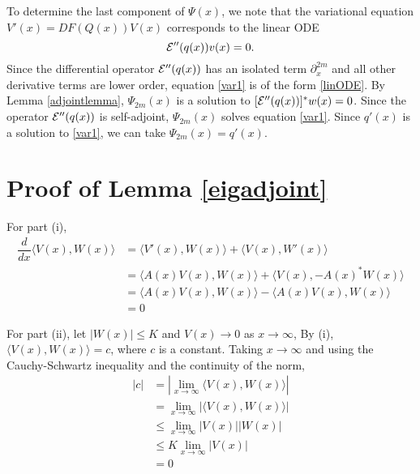 \documentclass[thesis.tex]{subfiles}
\begin{document}
To determine the last component of $\Psi(x)$, we note that the variational equation $V'(x) = DF(Q(x)) V(x)$ corresponds to the linear ODE 
\begin{equation}\label{var1}
\mathcal{E}''(q(x))v(x) = 0.
\end{equation}
Since the differential operator $\mathcal{E}''(q(x))$ has an isolated term $\partial_x^{2m}$ and all other derivative terms are lower order, equation \eqref{var1} is of the form \eqref{linODE}. By Lemma \ref{adjointlemma}, $\Psi_{2m}(x)$ is a solution to $[\mathcal{E}''(q(x))]^* w(x) = 0$. Since the operator $\mathcal{E}''(q(x))$ is self-adjoint, $\Psi_{2m}(x)$ solves equation \eqref{var1}. Since $q'(x)$ is a solution to \eqref{var1}, we can take $\Psi_{2m}(x) = q'(x)$.

\section{Proof of Lemma \ref{eigadjoint}}

For part (i), 
\begin{align*}
\dfrac{d}{dx}\langle V(x), W(x) \rangle &= 
\langle V'(x), W(x) \rangle + \langle V(x), W'(x) \rangle \\
&= \langle A(x)V(x), W(x) \rangle + \langle V(x), -A(x)^* W(x) \rangle \\
&= \langle A(x)V(x), W(x) \rangle - \langle A(x)V(x), W(x) \rangle \\
&= 0
\end{align*}

For part (ii), let $|W(x)| \leq K$ and $V(x) \rightarrow 0$ as $x \rightarrow \infty$, By (i), $\langle V(x), W(x) \rangle = c$, where $c$ is a constant. Taking $x \rightarrow \infty$ and using the Cauchy-Schwartz inequality and the continuity of the norm,
\begin{align*}
|c| &= \left| \lim_{x\rightarrow \infty} \langle V(x), W(x) \rangle \right| \\
&= \lim_{x\rightarrow \infty} \left| \langle V(x), W(x) \rangle \right| \\
&\leq \lim_{x\rightarrow \infty} |V(x)||W(x)| \\
&\leq K \lim_{x\rightarrow \infty} |V(x)| \\
&= 0
\end{align*}
\end{document}
